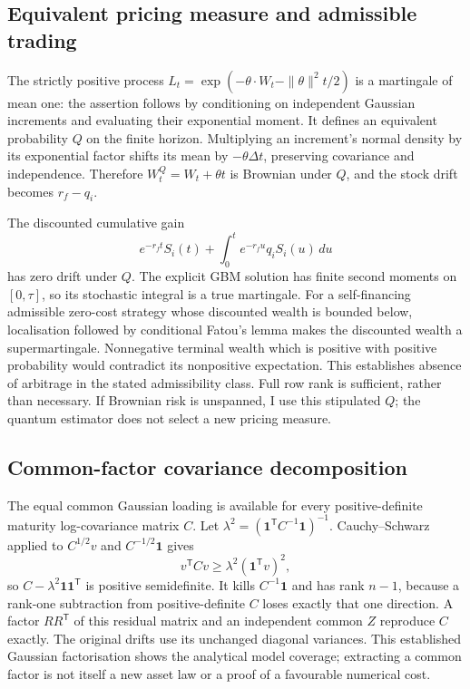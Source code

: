 \documentclass[11pt]{article}
\begin{document}
\subsection{Equivalent pricing measure and admissible trading}
\label{app:measure-change}

The strictly positive process
$L_t=\exp(-\theta\cdot W_t-\|\theta\|^2t/2)$ is a martingale of mean one:
the assertion follows by conditioning on independent Gaussian increments
and evaluating their exponential moment.  It defines an equivalent
probability $Q$ on the finite horizon.  Multiplying an increment's normal
density by its exponential factor shifts its mean by
$-\theta\Delta t$, preserving covariance and independence.  Therefore
$W_t^Q=W_t+\theta t$ is Brownian under $Q$, and the stock drift becomes
$r_f-q_i$.

The discounted cumulative gain
\begin{equation}
 e^{-r_ft}S_i(t)+\int_0^t e^{-r_fu}q_iS_i(u)\,du
\end{equation}
has zero drift under $Q$.  The explicit GBM solution has finite second
moments on $[0,\tau]$, so its stochastic integral is a true martingale.
For a self-financing admissible zero-cost strategy whose discounted wealth
is bounded below, localisation followed by conditional Fatou's lemma makes
the discounted wealth a supermartingale.  Nonnegative terminal wealth which
is positive with positive probability would contradict its nonpositive
expectation.  This establishes absence of arbitrage in the stated
admissibility class.  Full row rank is sufficient, rather than necessary.
If Brownian risk is unspanned, I use this stipulated $Q$; the quantum
estimator does not select a new pricing measure.

\subsection{Common-factor covariance decomposition}
\label{app:common-factor}

The equal common Gaussian loading is available for every positive-definite
maturity log-covariance matrix $C$. Let
$\lambda^2=(\mathbf1^{\mathsf T}C^{-1}\mathbf1)^{-1}$.
Cauchy--Schwarz applied to $C^{1/2}v$ and $C^{-1/2}\mathbf1$ gives
\begin{equation}
 v^{\mathsf T}Cv\geq
 \lambda^2(\mathbf1^{\mathsf T}v)^2,
\end{equation}
so $C-\lambda^2\mathbf1\mathbf1^{\mathsf T}$ is positive semidefinite.
It kills $C^{-1}\mathbf1$ and has rank $n-1$, because a rank-one
subtraction from positive-definite $C$ loses exactly that one direction.
A factor $RR^{\mathsf T}$ of this residual matrix and an independent
common $Z$ reproduce $C$ exactly. The original drifts use its unchanged
diagonal variances. This established Gaussian factorisation shows the
analytical model coverage; extracting a common factor is not itself a
new asset law or a proof of a favourable numerical cost.
\end{document}

